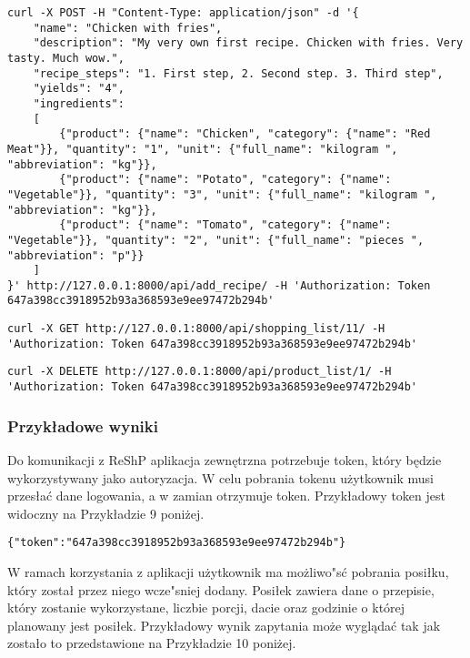 \documentclass{article}
\begin{document}
\begin{lstlisting}[label=recipe_api,caption=Dodawanie przepisu,breaklines=true]
curl -X POST -H "Content-Type: application/json" -d '{
    "name": "Chicken with fries",
    "description": "My very own first recipe. Chicken with fries. Very tasty. Much wow.",
    "recipe_steps": "1. First step, 2. Second step. 3. Third step",
    "yields": "4",
    "ingredients": 
    [
        {"product": {"name": "Chicken", "category": {"name": "Red Meat"}}, "quantity": "1", "unit": {"full_name": "kilogram ", "abbreviation": "kg"}},
        {"product": {"name": "Potato", "category": {"name": "Vegetable"}}, "quantity": "3", "unit": {"full_name": "kilogram ", "abbreviation": "kg"}},
        {"product": {"name": "Tomato", "category": {"name": "Vegetable"}}, "quantity": "2", "unit": {"full_name": "pieces ", "abbreviation": "p"}}
    ]
}' http://127.0.0.1:8000/api/add_recipe/ -H 'Authorization: Token 647a398cc3918952b93a368593e9ee97472b294b'
\end{lstlisting}

\begin{lstlisting}[label=shoppinglist_api,caption=Pobieranie listy zakupów,breaklines=true]
curl -X GET http://127.0.0.1:8000/api/shopping_list/11/ -H 'Authorization: Token 647a398cc3918952b93a368593e9ee97472b294b'
\end{lstlisting}

\begin{lstlisting}[label=product_api,caption=Usuwanie produktu,breaklines=true]
curl -X DELETE http://127.0.0.1:8000/api/product_list/1/ -H 'Authorization: Token 647a398cc3918952b93a368593e9ee97472b294b'
\end{lstlisting}

\subsubsection{Przykładowe wyniki}
Do komunikacji z ReShP aplikacja zewnętrzna potrzebuje token, który będzie wykorzystywany jako autoryzacja. W celu pobrania tokenu użytkownik musi przesłać dane logowania, a w zamian otrzymuje token. Przykładowy token jest widoczny na Przykładzie 9 poniżej.

\begin{lstlisting}[label=token_api,caption=Pobranie tokenu,breaklines=true]
{"token":"647a398cc3918952b93a368593e9ee97472b294b"}
\end{lstlisting}

W ramach korzystania z aplikacji użytkownik ma możliwo"sć pobrania posiłku, który został przez niego wcze"sniej dodany. Posiłek zawiera dane o przepisie, który zostanie wykorzystane, liczbie porcji, dacie oraz godzinie o której planowany jest posiłek. Przykładowy wynik zapytania może wyglądać tak jak zostało to przedstawione na Przykładzie 10 poniżej.
\end{document}
